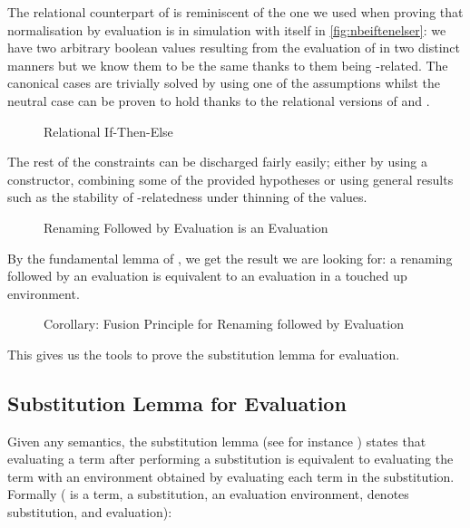 The relational counterpart of  is reminiscent of the one we used when
proving that normalisation by evaluation is in simulation with itself in
\cref{fig:nbeiftenelser}: we have two arbitrary boolean values resulting from the
evaluation of  in two distinct manners but we know them to be the same thanks
to them being -related. The canonical cases are trivially solved by
using one of the assumptions whilst the neutral case can be proven to hold thanks
to the relational versions of  and .

\begin{figure}[h]
\caption{Relational If-Then-Else}
\end{figure}

The rest of the constraints can be discharged fairly easily; either by using a
constructor, combining some of the provided hypotheses or using general results
such as the stability of -relatedness under thinning of the 
values.

\begin{figure}[h]
\caption{Renaming Followed by Evaluation is an Evaluation}
\end{figure}


By the fundamental lemma of , we get the result we are looking for:
a renaming followed by an evaluation is equivalent to an evaluation in a touched
up environment.

\begin{figure}[h]
\caption{Corollary: Fusion Principle for Renaming followed by Evaluation\label{fig:renevalfun}}
\end{figure}

This gives us the tools to prove the substitution lemma for evaluation.

\subsection{Substitution Lemma for Evaluation}

Given any semantics, the substitution lemma (see for instance \cite{mitchell1991kripke})
states that evaluating a term after performing a substitution is equivalent to evaluating
the term with an environment obtained by evaluating each term in the substitution.
Formally ( is a term,  a substitution,  an evaluation environment,
\AF{\_[\_]} denotes substitution, and  evaluation):

